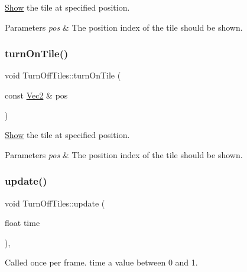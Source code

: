 \hyperlink{classShow}{Show} the tile at specified position. 


\begin{DoxyParams}{Parameters}
{\em pos} & The position index of the tile should be shown. \\
\hline
\end{DoxyParams}
\mbox{\label{classTurnOffTiles_a163856e08a10c7c6f5432c29d560f797}} 
\subsubsection{\texorpdfstring{turn\+On\+Tile()}{turnOnTile()}\hspace{0.1cm}{\footnotesize\ttfamily [2/2]}}
{\footnotesize\ttfamily void Turn\+Off\+Tiles\+::turn\+On\+Tile (\begin{DoxyParamCaption}\item[{const \hyperlink{classVec2}{Vec2} \&}]{pos }\end{DoxyParamCaption})}



\hyperlink{classShow}{Show} the tile at specified position. 


\begin{DoxyParams}{Parameters}
{\em pos} & The position index of the tile should be shown. \\
\hline
\end{DoxyParams}
\mbox{\label{classTurnOffTiles_a7388045e189c5831c6ebc4616f7ad752}} 
\subsubsection{\texorpdfstring{update()}{update()}\hspace{0.1cm}{\footnotesize\ttfamily [1/2]}}
{\footnotesize\ttfamily void Turn\+Off\+Tiles\+::update (\begin{DoxyParamCaption}\item[{float}]{time }\end{DoxyParamCaption})\hspace{0.3cm}{\ttfamily [override]}, {\ttfamily [virtual]}}

Called once per frame. time a value between 0 and 1.


